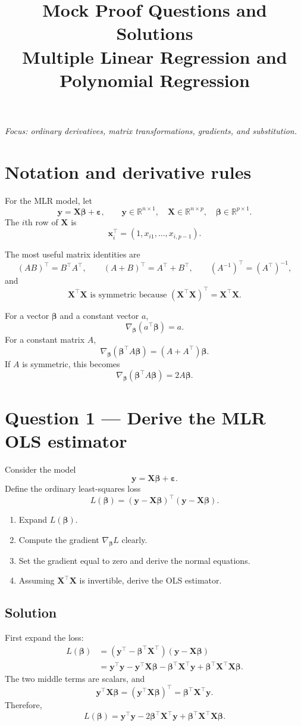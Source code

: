﻿\documentclass[11pt]{article}
\title{Mock Proof Questions and Solutions\\[2mm]
\large Multiple Linear Regression and Polynomial Regression}
\author{}
\date{}
\newcommand{\yvec}{\mathbf y}
\newcommand{\bvec}{\boldsymbol\beta}
\newcommand{\evec}{\boldsymbol\varepsilon}
\newcommand{\xmat}{\mathbf X}
\newcommand{\R}{\mathbb R}
\begin{document}
\maketitle

\begin{center}
\textit{Focus: ordinary derivatives, matrix transformations, gradients, and substitution.}
\end{center}

\section*{Notation and derivative rules}
For the MLR model, let
\[
\yvec=\xmat\bvec+\evec,
\qquad
\yvec\in\R^{n\times1},\quad
\xmat\in\R^{n\times p},\quad
\bvec\in\R^{p\times1}.
\]
The $i$th row of $\xmat$ is
\[
\mathbf x_i^\top=(1,x_{i1},\ldots,x_{i,p-1}).
\]

The most useful matrix identities are
\[
(AB)^\top=B^\top A^\top,
\qquad
(A+B)^\top=A^\top+B^\top,
\qquad
(A^{-1})^\top=(A^\top)^{-1},
\]
and
\[
\xmat^\top\xmat\text{ is symmetric because }
(\xmat^\top\xmat)^\top=\xmat^\top\xmat.
\]

For a vector $\bvec$ and a constant vector $a$,
\[
\nabla_{\bvec}(a^\top\bvec)=a.
\]
For a constant matrix $A$,
\[
\nabla_{\bvec}(\bvec^\top A\bvec)=(A+A^\top)\bvec.
\]
If $A$ is symmetric, this becomes
\[
\nabla_{\bvec}(\bvec^\top A\bvec)=2A\bvec.
\]

\newpage
\section*{Question 1 --- Derive the MLR OLS estimator}
Consider the model
\[
\yvec=\xmat\bvec+\evec.
\]
Define the ordinary least-squares loss
\[
L(\bvec)=(\yvec-\xmat\bvec)^\top(\yvec-\xmat\bvec).
\]
\begin{enumerate}[label=(\alph*)]
\item Expand $L(\bvec)$.
\item Compute the gradient $\nabla_{\bvec}L$ clearly.
\item Set the gradient equal to zero and derive the normal equations.
\item Assuming $\xmat^\top\xmat$ is invertible, derive the OLS estimator.
\end{enumerate}

\subsection*{Solution}
First expand the loss:
\begin{align*}
L(\bvec)
&=(\yvec^\top-\bvec^\top\xmat^\top)(\yvec-\xmat\bvec)\\
&=\yvec^\top\yvec-\yvec^\top\xmat\bvec
-\bvec^\top\xmat^\top\yvec
+\bvec^\top\xmat^\top\xmat\bvec.
\end{align*}
The two middle terms are scalars, and
\[
\yvec^\top\xmat\bvec
=\left(\yvec^\top\xmat\bvec\right)^\top
=\bvec^\top\xmat^\top\yvec.
\]
Therefore,
\[
L(\bvec)=\yvec^\top\yvec
-2\bvec^\top\xmat^\top\yvec
+\bvec^\top\xmat^\top\xmat\bvec.
\]
\end{document}
